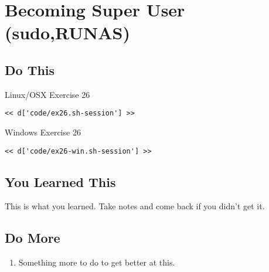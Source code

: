 \chapter{Becoming Super User (sudo,RUNAS)}

\section{Do This}

\begin{code}{Linux/OSX Exercise 26}
\begin{Verbatim}
<< d['code/ex26.sh-session'] >>
\end{Verbatim}
\end{code}

\begin{code}{Windows Exercise 26}
\begin{Verbatim}
<< d['code/ex26-win.sh-session'] >>
\end{Verbatim}
\end{code}

\section{You Learned This}

This is what you learned.  Take notes and come back if you didn't get it.

\section{Do More}

\begin{enumerate}
\item Something more to do to get better at this.
\end{enumerate}

